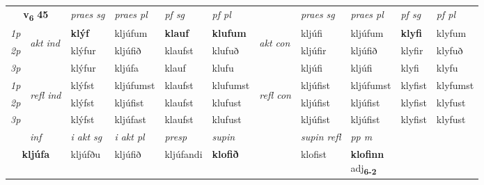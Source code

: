 \noindent
\begin{tabular}{lllllllllll} \toprule
\multicolumn{2}{c}{\textbf{v{\textsubscript{6}}} \Large{\textbf{45}}}  &  \textit{praes sg}  & \textit{praes pl}  &\textit{ pf sg} & \textit{pf pl} &  &  \textit{praes sg}  & \textit{praes pl}  & \textit{pf sg} & \textit{pf pl } \\*
	\cmidrule{3-6} \cmidrule{8-11}
 {\textit{1p}} & \multirow{3}{*}{\begin{turn}{90}\textit{akt ind}\end{turn}} & \textbf{klýf} & kljúfum & \textbf{klauf} & \textbf{klufum} & \multirow{3}{*}{\begin{turn}{90}\textit{akt con}\end{turn}} &kljúfi & kljúfum & \textbf{klyfi} & klyfum\\*
 {\textit{2p}} &  &  klýfur  & kljúfið & klaufst & klufuð & & kljúfir & kljúfið & klyfir & klyfuð \\*
{\textit{3p}} &  & klýfur & kljúfa & klauf & klufu & & kljúfi & kljúfi& klyfi & klyfu \\*
\cmidrule{3-6} \cmidrule{8-11}
 {\textit{1p}} & \multirow{3}{*}{\begin{turn}{90}\textit{refl ind}\end{turn}}  & klýfst & kljúfumst & klaufst & klufumst & \multirow{3}{*}{\begin{turn}{90}\textit{refl con}\end{turn}}  &kljúfist & kljúfumst & klyfist & klyfumst \\*
 {\textit{2p}} &  & klýfst & kljúfist & klaufst & klufust & &kljúfist & kljúfist & klyfist & klyfust \\*
 {\textit{3p}}  & & klýfst & kljúfast & klaufst & klufust & & kljúfist & kljúfist& klyfist & klyfust \\*
\cmidrule{3-6} \cmidrule{8-11}

   \multicolumn{2}{c}{\textit{inf}}  & \textit{i akt sg} & \textit{i akt pl}   & \textit{presp} & \textit{supin} && \textit{supin refl} & \textit{pp m} \\*
  \multicolumn{2}{c}{\textbf{kljúfa}} & kljúfðu  & kljúfið   & kljúfandi &  \textbf{klofið} && klofist & \specialcell{\textbf{klofinn} \\ adj\textbf{\textsubscript{6-2}}} \\*
\end{tabular}

